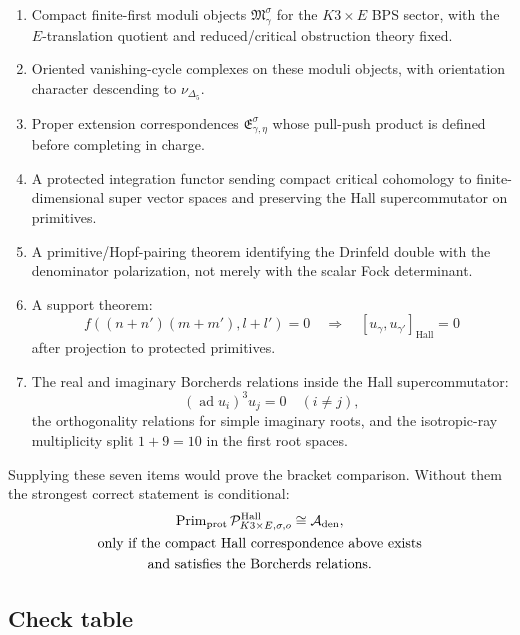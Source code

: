 \begin{enumerate}
\item Compact finite-first moduli objects
\(\mathfrak M_\gamma^\sigma\) for the \(K3\times E\) BPS sector, with
the \(E\)-translation quotient and reduced/critical obstruction theory
fixed.
\item Oriented vanishing-cycle complexes on these moduli objects, with
orientation character descending to \(\nu_{\Delta_5}\).
\item Proper extension correspondences
\(\mathfrak E_{\gamma,\eta}^\sigma\) whose pull-push product is defined
before completing in charge.
\item A protected integration functor sending compact critical
cohomology to finite-dimensional super vector spaces and preserving the
Hall supercommutator on primitives.
\item A primitive/Hopf-pairing theorem identifying the Drinfeld double
with the denominator polarization, not merely with the scalar Fock
determinant.
\item A support theorem:
$$
f((n+n')(m+m'),l+l')=0
\quad\Longrightarrow\quad
[u_\gamma,u_{\gamma'}]_{\mathrm{Hall}}=0
$$
after projection to protected primitives.
\item The real and imaginary Borcherds relations inside the Hall
supercommutator:
$$
(\operatorname{ad}u_i)^3u_j=0\quad(i\neq j),
$$
the orthogonality relations for simple imaginary roots, and the
isotropic-ray multiplicity split \(1+9=10\) in the first root spaces.
\end{enumerate}

Supplying these seven items would prove the bracket comparison.  Without
them the strongest correct statement is conditional:
$$
\begin{gathered}
\operatorname{Prim}_{\mathrm{prot}}\mathcal P^{\mathrm{Hall}}_{K3\times E,\sigma,o}
\cong
\mathcal A_{\mathrm{den}},\\
\text{only if the compact Hall correspondence above exists}\\
\text{and satisfies the Borcherds relations.}
\end{gathered}
$$

\subsection{Check table}

